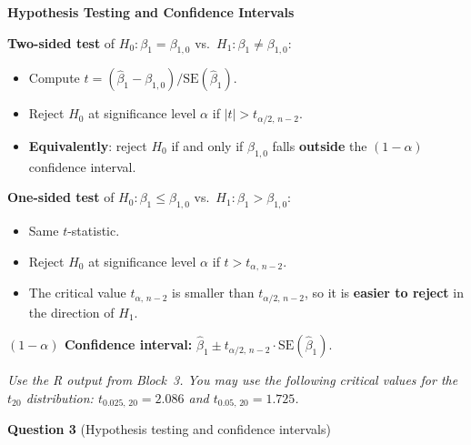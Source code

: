 \documentclass[11pt,a4paper]{article}
\begin{document}
\begin{bookexample}
\textbf{\color{blockcolor}Hypothesis Testing and Confidence Intervals}

\smallskip
\textbf{Two-sided test} of $H_0\colon \beta_1 = \beta_{1,0}$ vs.\ $H_1\colon \beta_1 \ne \beta_{1,0}$:
\begin{itemize}[leftmargin=1.5em,itemsep=2pt]
  \item Compute $t = (\hat{\beta}_1 - \beta_{1,0})/\text{SE}(\hat{\beta}_1)$.
  \item Reject $H_0$ at significance level $\alpha$ if $|t| > t_{\alpha/2,\, n-2}$.
  \item \textbf{Equivalently}: reject $H_0$ if and only if $\beta_{1,0}$ falls \textbf{outside} the $(1-\alpha)$ confidence interval.
\end{itemize}

\smallskip
\textbf{One-sided test} of $H_0\colon \beta_1 \le \beta_{1,0}$ vs.\ $H_1\colon \beta_1 > \beta_{1,0}$:
\begin{itemize}[leftmargin=1.5em,itemsep=2pt]
  \item Same $t$-statistic.
  \item Reject $H_0$ at significance level $\alpha$ if $t > t_{\alpha,\, n-2}$.
  \item The critical value $t_{\alpha,\, n-2}$ is smaller than $t_{\alpha/2,\, n-2}$, so it is \textbf{easier to reject} in the direction of $H_1$.
\end{itemize}

\smallskip
\textbf{$(1-\alpha)$ Confidence interval:}
$\hat{\beta}_1 \pm t_{\alpha/2,\, n-2} \cdot \text{SE}(\hat{\beta}_1)$.
\end{bookexample}

\medskip
\textit{Use the R output from Block~3. You may use the following critical values for the $t_{20}$ distribution: $t_{0.025,\, 20} = 2.086$ and $t_{0.05,\, 20} = 1.725$.}

\bigskip
\textbf{Question 3} (Hypothesis testing and confidence intervals)
\end{document}
